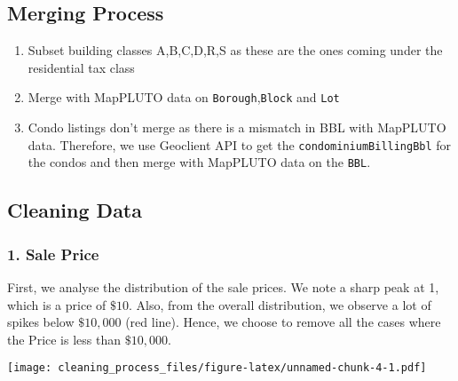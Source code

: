 \documentclass[]{article}
\newenvironment{Shaded}{\begin{snugshade}}{\end{snugshade}}
\newcommand{\DataTypeTok}[1]{\textcolor[rgb]{0.13,0.29,0.53}{#1}}
\newcommand{\DecValTok}[1]{\textcolor[rgb]{0.00,0.00,0.81}{#1}}
\newcommand{\KeywordTok}[1]{\textcolor[rgb]{0.13,0.29,0.53}{\textbf{#1}}}
\newcommand{\NormalTok}[1]{#1}
\newcommand{\OperatorTok}[1]{\textcolor[rgb]{0.81,0.36,0.00}{\textbf{#1}}}
\newcommand{\StringTok}[1]{\textcolor[rgb]{0.31,0.60,0.02}{#1}}
\providecommand{\tightlist}{%
  \setlength{\itemsep}{0pt}\setlength{\parskip}{0pt}}
\begin{document}
\hypertarget{merging-process}{%
\subsection{Merging Process}\label{merging-process}}

\begin{enumerate}
\def\labelenumi{\arabic{enumi}.}
\tightlist
\item
  Subset building classes A,B,C,D,R,S as these are the ones coming under
  the residential tax class
\item
  Merge with MapPLUTO data on \texttt{Borough},\texttt{Block} and
  \texttt{Lot}
\item
  Condo listings don't merge as there is a mismatch in BBL with MapPLUTO
  data. Therefore, we use Geoclient API to get the
  \texttt{condominiumBillingBbl} for the condos and then merge with
  MapPLUTO data on the \texttt{BBL}.
\end{enumerate}

\hypertarget{cleaning-data}{%
\subsection{Cleaning Data}\label{cleaning-data}}

\hypertarget{sale-price}{%
\subsubsection{1. Sale Price}\label{sale-price}}

First, we analyse the distribution of the sale prices. We note a sharp
peak at 1, which is a price of \(\$10\). Also, from the overall
distribution, we observe a lot of spikes below \(\$10,000\) (red line).
Hence, we choose to remove all the cases where the Price is less than
\(\$10,000\).

\begin{Shaded}
\end{Shaded}

\texttt{[image: cleaning\_process\_files/figure-latex/unnamed-chunk-4-1.pdf]}
\end{document}
